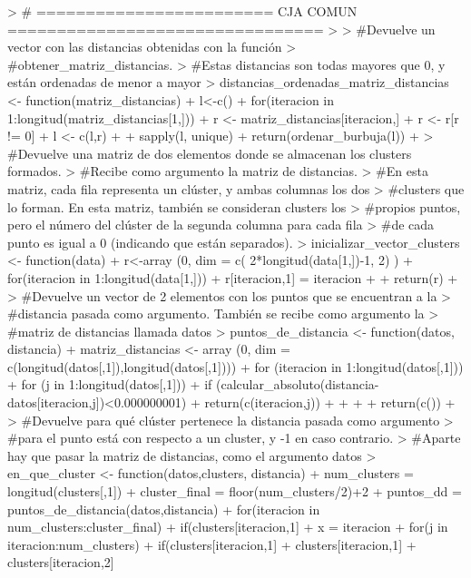 \documentclass[parskip=full]{scrartcl}
\begin{document}
\begin{Schunk}
\begin{Sinput}
> # ======================== CJA COMUN ================================
> 
> #Devuelve un vector con las distancias obtenidas con la función 
> #obtener_matriz_distancias.
> #Estas distancias son todas mayores que 0, y están ordenadas de menor a mayor
> distancias_ordenadas_matriz_distancias <- function(matriz_distancias) {
+   l<-c()
+   for(iteracion in 1:longitud(matriz_distancias[1,])) {
+     r <- matriz_distancias[iteracion,]
+     r <- r[r != 0]
+     l <- c(l,r)
+   }
+   sapply(l, unique)
+   return(ordenar_burbuja(l))
+ }
> #Devuelve una matriz de dos elementos donde se almacenan los clusters formados. 
> #Recibe como argumento la matriz de distancias. 
> #En esta matriz, cada fila representa un clúster, y ambas columnas los dos 
> #clusters que lo forman. En esta matriz, también se consideran clusters los 
> #propios puntos, pero el número del clúster de la segunda columna para cada fila
> #de cada punto es igual a 0 (indicando que están separados).
> inicializar_vector_clusters <- function(data){
+   r<-array (0, dim = c( 2*longitud(data[1,])-1, 2) )
+   for(iteracion in 1:longitud(data[1,])){
+     r[iteracion,1] = iteracion
+   }
+   return(r)
+ }
> #Devuelve un vector de 2 elementos con los puntos que se encuentran a la 
> #distancia pasada como argumento. También se recibe como argumento la 
> #matriz de distancias llamada datos
> puntos_de_distancia <- function(datos, distancia) {
+   matriz_distancias <- array (0, dim = c(longitud(datos[,1]),longitud(datos[,1])))
+   for (iteracion in 1:longitud(datos[,1])){
+     for (j in 1:longitud(datos[,1])){
+       if (calcular_absoluto(distancia-datos[iteracion,j])<0.000000001){
+         return(c(iteracion,j))
+       }
+     }
+   }
+   return(c())
+ }
> #Devuelve para qué clúster pertenece la distancia pasada como argumento
> #para el punto está con respecto a un cluster, y -1 en caso contrario. 
> #Aparte hay que pasar la matriz de distancias, como el argumento datos
> en_que_cluster <- function(datos,clusters, distancia){
+   num_clusters = longitud(clusters[,1])
+   cluster_final = floor(num_clusters/2)+2
+   puntos_dd = puntos_de_distancia(datos,distancia)
+   for(iteracion in num_clusters:cluster_final){
+     if(clusters[iteracion,1] %
+       x = iteracion
+       for(j in iteracion:num_clusters){
+         if(clusters[iteracion,1] %
+         clusters[iteracion,1] %
+         clusters[iteracion,2] %
}}}
\end{Sinput}
\end{Schunk}
\end{document}

